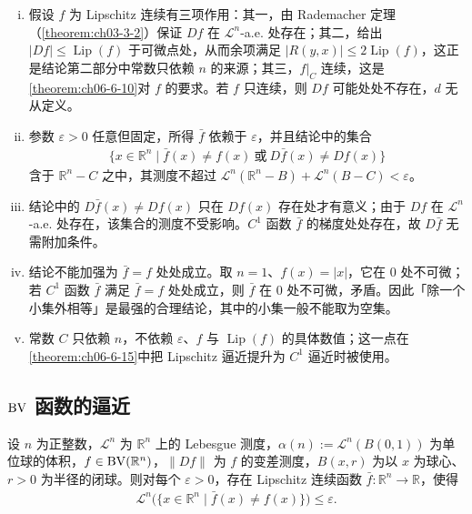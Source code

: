 \documentclass[../../main.tex]{subfiles}%
\begin{document}
\begin{remark}\label{remark:ch06-thm-6-11-条件}
\begin{enumerate}[(i)]
\item 假设 $f$ 为 Lipschitz 连续有三项作用：其一，由 Rademacher 定理（\cref{theorem:ch03-3-2}）保证 $Df$ 在 $\mathcal{L}^n$-a.e. 处存在；其二，给出 $\lvert Df\rvert\le\operatorname{Lip}(f)$ 于可微点处，从而余项满足 $\lvert R(y,x)\rvert\le2\operatorname{Lip}(f)$，这正是结论第二部分中常数只依赖 $n$ 的来源；其三，$f|_C$ 连续，这是\cref{theorem:ch06-6-10}对 $f$ 的要求。若 $f$ 只连续，则 $Df$ 可能处处不存在，$d$ 无从定义。%
\item 参数 $\varepsilon>0$ 任意但固定，所得 $\bar f$ 依赖于 $\varepsilon$，并且结论中的集合
\begin{align*}
\{x\in\mathbb{R}^n\mid\bar f(x)\ne f(x)\ \text{或}\ D\bar f(x)\ne Df(x)\}
\end{align*}
含于 $\mathbb{R}^n-C$ 之中，其测度不超过 $\mathcal{L}^n(\mathbb{R}^n-B)+\mathcal{L}^n(B-C)<\varepsilon$。
\item 结论中的 $D\bar f(x)\ne Df(x)$ 只在 $Df(x)$ 存在处才有意义；由于 $Df$ 在 $\mathcal{L}^n$-a.e. 处存在，该集合的测度不受影响。$C^1$ 函数 $\bar f$ 的梯度处处存在，故 $D\bar f$ 无需附加条件。
\item 结论不能加强为 $\bar f=f$ 处处成立。取 $n=1$、$f(x)=\lvert x\rvert$，它在 $0$ 处不可微；若 $C^1$ 函数 $\bar f$ 满足 $\bar f=f$ 处处成立，则 $\bar f$ 在 $0$ 处不可微，矛盾。因此「除一个小集外相等」是最强的合理结论，其中的小集一般不能取为空集。
\item 常数 $C$ 只依赖 $n$，不依赖 $\varepsilon$、$f$ 与 $\operatorname{Lip}(f)$ 的具体数值；这一点在\cref{theorem:ch06-6-15}中把 Lipschitz 逼近提升为 $C^1$ 逼近时被使用。%
\end{enumerate}
\end{remark}

\subsection{$\BV$ 函数的逼近}\label{subsection:ch06-06-2}

\begin{theorem}[$\BV$ 函数的逼近]\label{theorem:ch06-6-12}
设 $n$ 为正整数，$\mathcal{L}^n$ 为 $\mathbb{R}^n$ 上的 Lebesgue 测度，$\alpha(n):=\mathcal{L}^n(B(0,1))$ 为单位球的体积，$f\in\mathrm{BV}(\mathbb{R}^n)$，$\lVert Df\rVert$ 为 $f$ 的变差测度，$B(x,r)$ 为以 $x$ 为球心、$r>0$ 为半径的闭球。则对每个 $\varepsilon>0$，存在 Lipschitz 连续函数 $\bar f:\mathbb{R}^n\to\mathbb{R}$，使得
\begin{align*}
\mathcal{L}^n\bigl(\{x\in\mathbb{R}^n\mid\bar f(x)\ne f(x)\}\bigr)\le\varepsilon .
\end{align*}
\end{theorem}
\end{document}
